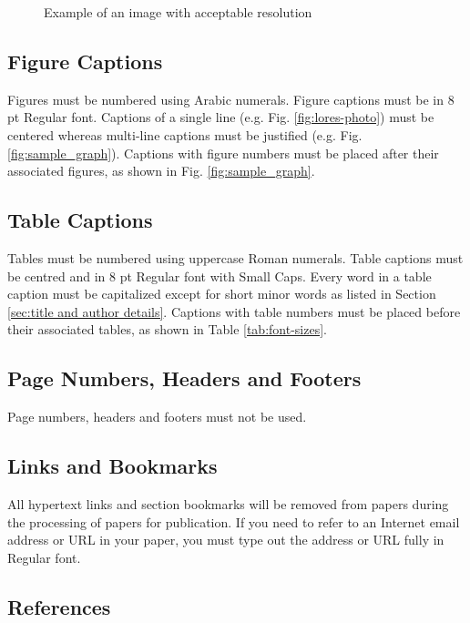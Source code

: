\documentclass[10pt,conference,a4paper]{IEEEtran}
\begin{document}
\begin{figure}[h]
	\centerline{ }
	\caption{Example of an image with acceptable resolution}
	\label{fig:hires-photo}
\end{figure}

\subsection{Figure Captions}

Figures must be numbered using Arabic numerals.  Figure captions must
be in 8 pt Regular font.  Captions of a single line (e.g. Fig.
\ref{fig:lores-photo}) must be centered whereas multi-line captions
must be justified (e.g. Fig.  \ref{fig:sample_graph}).  Captions with
figure numbers must be placed after their associated figures, as shown
in Fig. \ref{fig:sample_graph}.

\subsection{Table Captions}

Tables must be numbered using uppercase Roman numerals.  Table
captions must be centred and in 8 pt Regular font with Small Caps.
Every word in a table caption must be capitalized except for short
minor words as listed in Section \ref{sec:title and author details}.
Captions with table numbers must be placed before their associated
tables, as shown in Table \ref{tab:font-sizes}.

\subsection{Page Numbers, Headers and Footers}

Page numbers, headers and footers must not be used.

\subsection{Links and Bookmarks}

All hypertext links and section bookmarks will be removed from
papers during the processing of papers for publication.  If you
need to refer to an Internet email address or URL in your paper,
you must type out the address or URL fully in Regular font.

\subsection{References}
\end{document}
